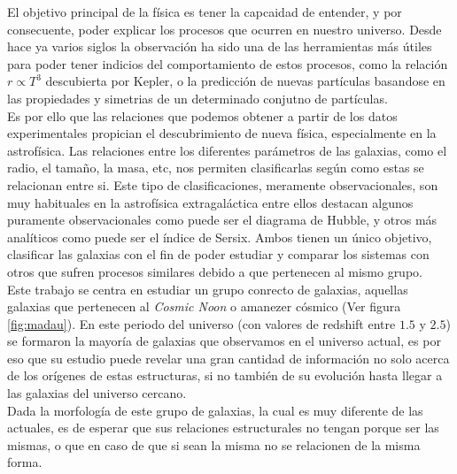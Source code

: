 \documentclass[11pt, a4paper]{article} %
\begin{document}
El objetivo principal de la física es tener la capcaidad de entender, y por consecuente, poder explicar los procesos que ocurren en 
nuestro universo. Desde hace ya varios siglos la observación ha sido una de las herramientas más útiles para poder tener indicios del comportamiento de estos procesos,
como la relación $r\propto T^3$ descubierta por Kepler, o la predicción de nuevas partículas basandose en las propiedades y simetrias de un 
determinado conjutno de partículas. \\

Es por ello que las relaciones que podemos obtener a partir de los datos experimentales propician el descubrimiento de nueva física, especialmente en la astrofísica.
Las relaciones entre los diferentes parámetros de las galaxias, como el radio, el tamaño, la masa, etc, nos permiten clasificarlas según como estas se relacionan entre si. 
Este tipo de clasificaciones, meramente observacionales, son muy habituales en la astrofísica extragaláctica entre ellos destacan algunos puramente observacionales como puede ser el diagrama de Hubble, 
y otros más analíticos como puede ser el índice de Sersix. Ambos tienen un único objetivo, clasificar las galaxias con el fin de poder estudiar y comparar los sistemas con otros que sufren procesos similares debido a que pertenecen al mismo grupo.\\

Este trabajo se centra en estudiar un grupo conrecto de galaxias, aquellas galaxias que pertenecen al \textit{Cosmic Noon} o 
amanezer cósmico (Ver figura \ref{fig:madau}). En este periodo del universo (con valores de redshift entre $1.5$ y $2.5$) se formaron la mayoría de galaxias que 
observamos en el universo actual, es por eso que su estudio puede revelar una gran cantidad de información no solo acerca de los orígenes
de estas estructuras, si no también de su evolución hasta llegar a las galaxias del universo cercano. \\


Dada la morfología de este grupo de galaxias, la cual es muy diferente de las actuales, es de esperar que sus relaciones estructurales 
no tengan porque ser las mismas, o que en caso de que si sean la misma no se relacionen de la misma forma. 
\end{document}
